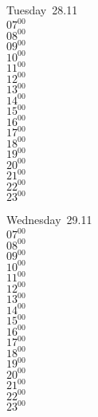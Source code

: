 \documentclass[11pt, a4paper]{book}\usepackage[]{graphicx}\usepackage[]{color}
\begin{document}
\begin{weekdaybox}
  Tuesday~28.11\\
  { 
  \vfill
  $07^{00}$\\
$08^{00}$\\
$09^{00}$\\
$10^{00}$\\
$11^{00}$\\
$12^{00}$\\
$13^{00}$\\
$14^{00}$\\
$15^{00}$\\
$16^{00}$\\
$17^{00}$\\
$18^{00}$\\
$19^{00}$\\
$20^{00}$\\
$21^{00}$\\
$22^{00}$\\
$23^{00}$\\
  }
\end{weekdaybox}
\begin{weekdaybox}
  Wednesday~29.11\\
  { 
  \vfill
  $07^{00}$\\
$08^{00}$\\
$09^{00}$\\
$10^{00}$\\
$11^{00}$\\
$12^{00}$\\
$13^{00}$\\
$14^{00}$\\
$15^{00}$\\
$16^{00}$\\
$17^{00}$\\
$18^{00}$\\
$19^{00}$\\
$20^{00}$\\
$21^{00}$\\
$22^{00}$\\
$23^{00}$\\
  }
\end{weekdaybox}
\clearpage
\begin{headerbox}
\end{headerbox}
\end{document}
